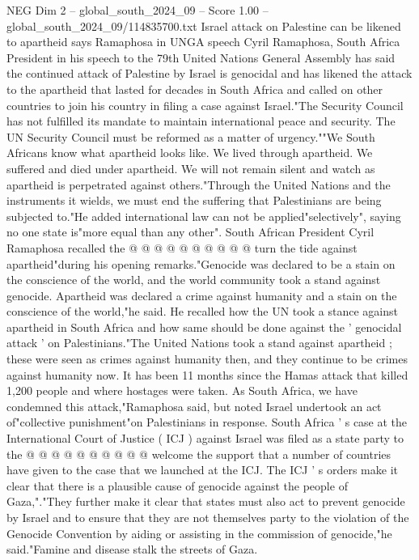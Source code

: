\begin{textsample}{NEG Dim 2 – global\_south\_2024\_09 – Score 1.00 – global\_south\_2024\_09/114835700.txt}  \label{ex:f2_neg_255}
Israel attack on Palestine can be likened to apartheid says Ramaphosa in UNGA speech Cyril Ramaphosa, South Africa President in his speech to the 79th United Nations General Assembly has said the continued attack of Palestine by Israel is genocidal and has likened the attack to the apartheid that lasted for decades in South Africa and called on other countries to join his country in filing a case against Israel."The Security Council has not fulfilled its mandate to maintain international peace and security.
The UN Security Council must be reformed as a matter of urgency.""We South Africans know what apartheid looks like.
We lived through apartheid.
We suffered and died under apartheid.
We will not remain silent and watch as apartheid is perpetrated against others."Through the United Nations and the instruments it wields, we must end the suffering that Palestinians are being subjected to."He added international law can not be applied"selectively", saying no one state is"more equal than any other".
South African President Cyril Ramaphosa recalled the @ @ @ @ @ @ @ @ @ @ turn the tide against apartheid"during his opening remarks."Genocide was declared to be a stain on the conscience of the world, and the world community took a stand against genocide.
Apartheid was declared a crime against humanity and a stain on the conscience of the world,"he said.
He recalled how the UN took a stance against apartheid in South Africa and how same should be done against the ' genocidal attack ' on Palestinians."The United Nations took a stand against apartheid ; these were seen as crimes against humanity then, and they continue to be crimes against humanity now.
It has been 11 months since the Hamas attack that killed 1,200 people and where hostages were taken.
As South Africa, we have condemned this attack,"Ramaphosa said, but noted Israel undertook an act of"collective punishment"on Palestinians in response.
South Africa ' s case at the International Court of Justice ( ICJ ) against Israel was filed as a state party to the @ @ @ @ @ @ @ @ @ @ welcome the support that a number of countries have given to the case that we launched at the ICJ.
The ICJ ' s orders make it clear that there is a plausible cause of genocide against the people of Gaza,"."They further make it clear that states must also act to prevent genocide by Israel and to ensure that they are not themselves party to the violation of the Genocide Convention by aiding or assisting in the commission of genocide,"he said."Famine and disease stalk the streets of Gaza.

\end{textsample}
